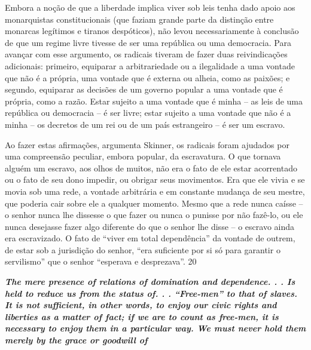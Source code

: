 \par
 
Embora a noção de que a liberdade implica viver sob leis tenha dado apoio aos monarquistas constitucionais (que faziam grande parte da distinção entre monarcas legítimos e tiranos despóticos), não levou necessariamente à conclusão de que um regime livre tivesse de ser uma república ou uma democracia. Para avançar com esse argumento, os radicais tiveram de fazer duas reivindicações adicionais: primeiro, equiparar a arbitrariedade ou a ilegalidade a uma vontade que não é a própria, uma vontade que é externa ou alheia, como as paixões; e segundo, equiparar as decisões de um governo popular a uma vontade que é própria, como a razão. Estar sujeito a uma vontade que é minha – as leis de uma república ou democracia – é ser livre; estar sujeito a uma vontade que não é a minha – os decretos de um rei ou de um país estrangeiro – é ser um escravo.
 
\par
 
Ao fazer estas afirmações, argumenta Skinner, os radicais foram ajudados por uma compreensão peculiar, embora popular, da escravatura. O que tornava alguém um escravo, aos olhos de muitos, não era o fato de ele estar acorrentado ou o fato de seu dono impedir, ou obrigar seus movimentos. Era que ele vivia e se movia sob uma rede, a vontade arbitrária e em constante mudança de seu mestre, que poderia cair sobre ele a qualquer momento. Mesmo que a rede nunca caísse – o senhor nunca lhe dissesse o que fazer ou nunca o punisse por não fazê-lo, ou ele nunca desejasse fazer algo diferente do que o senhor lhe disse – o escravo ainda era escravizado. O fato de “viver em total dependência” da vontade de outrem, de estar sob a jurisdição do senhor, “era suficiente por si só para garantir o servilismo” que o senhor “esperava e desprezava”. 20
 
\par
 

 \textbf{\textit{The mere presence of relations of domination and dependence. . . Is held to reduce us from the status of. . . “Free-men” to that of slaves. It is not sufficient, in other words, to enjoy our civic rights and liberties as a matter of fact; if we are to count as free-men, it is necessary to enjoy them in a particular way. We must never hold them merely by the grace or goodwill of} }  
 
 
\par
 

